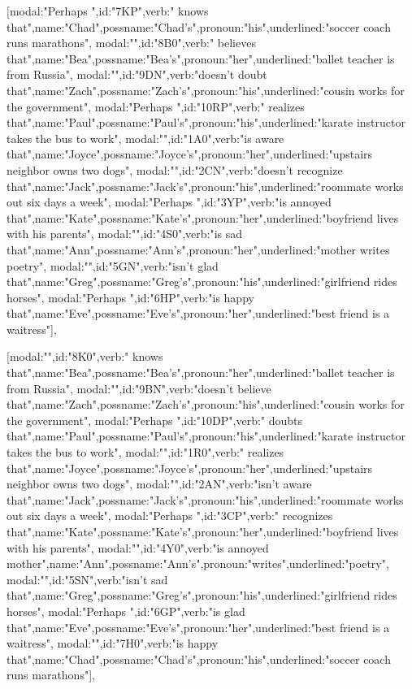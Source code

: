 [{modal:"Perhaps ",id:"7KP",verb:" knows that",name:"Chad",possname:"Chad's",pronoun:"his",underlined:"soccer coach runs marathons"},
{modal:"",id:"8B0",verb:" believes that",name:"Bea",possname:"Bea's",pronoun:"her",underlined:"ballet teacher is from Russia"},
{modal:"",id:"9DN",verb:"doesn't doubt that",name:"Zach",possname:"Zach's",pronoun:"his",underlined:"cousin works for the government"},
{modal:"Perhaps ",id:"10RP",verb:" realizes that",name:"Paul",possname:"Paul's",pronoun:"his",underlined:"karate instructor takes the bus to work"},
{modal:"",id:"1A0",verb:"is aware that",name:"Joyce",possname:"Joyce's",pronoun:"her",underlined:"upstairs neighbor owns two dogs"},
{modal:"",id:"2CN",verb:"doesn't recognize that",name:"Jack",possname:"Jack's",pronoun:"his",underlined:"roommate works out six days a week"},
{modal:"Perhaps ",id:"3YP",verb:"is annoyed that",name:"Kate",possname:"Kate's",pronoun:"her",underlined:"boyfriend lives with his parents"},
{modal:"",id:"4S0",verb:"is sad that",name:"Ann",possname:"Ann's",pronoun:"her",underlined:"mother writes poetry"},
{modal:"",id:"5GN",verb:"isn't glad that",name:"Greg",possname:"Greg's",pronoun:"his",underlined:"girlfriend rides horses"},
{modal:"Perhaps ",id:"6HP",verb:"is happy that",name:"Eve",possname:"Eve's",pronoun:"her",underlined:"best friend is a waitress"}],

[{modal:"",id:"8K0",verb:" knows that",name:"Bea",possname:"Bea's",pronoun:"her",underlined:"ballet teacher is from Russia"},
{modal:"",id:"9BN",verb:"doesn't believe that",name:"Zach",possname:"Zach's",pronoun:"his",underlined:"cousin works for the government"},
{modal:"Perhaps ",id:"10DP",verb:" doubts that",name:"Paul",possname:"Paul's",pronoun:"his",underlined:"karate instructor takes the bus to work"},
{modal:"",id:"1R0",verb:" realizes that",name:"Joyce",possname:"Joyce's",pronoun:"her",underlined:"upstairs neighbor owns two dogs"},
{modal:"",id:"2AN",verb:"isn't aware that",name:"Jack",possname:"Jack's",pronoun:"his",underlined:"roommate works out six days a week"},
{modal:"Perhaps ",id:"3CP",verb:" recognizes that",name:"Kate",possname:"Kate's",pronoun:"her",underlined:"boyfriend lives with his parents"},
{modal:"",id:"4Y0",verb:"is annoyed mother",name:"Ann",possname:"Ann's",pronoun:"writes",underlined:"poetry"},
{modal:"",id:"5SN",verb:"isn't sad that",name:"Greg",possname:"Greg's",pronoun:"his",underlined:"girlfriend rides horses"},
{modal:"Perhaps ",id:"6GP",verb:"is glad that",name:"Eve",possname:"Eve's",pronoun:"her",underlined:"best friend is a waitress"},
{modal:"",id:"7H0",verb:"is happy that",name:"Chad",possname:"Chad's",pronoun:"his",underlined:"soccer coach runs marathons"}],

